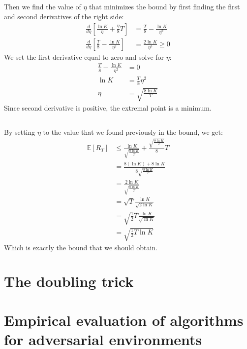 \documentclass[a4paper]{article}
\begin{document}
\subsection{}
\label{subsec:22}
Then we find the value of $\eta$ that minimizes the bound by first finding the
first and second derivatives of the right side:
\begin{align*}
  \frac{d}{d\eta} \left[\frac{\ln{K}}{\eta} + \frac{\eta}{8}T\right]&=
  \frac{T}{8} - \frac{\ln{K}}{\eta^2}\\
  \frac{d}{d\eta} \left[\frac{T}{8} - \frac{\ln{K}}{\eta^2} \right]
  &= \frac{2\ln{K}}{\eta^3} \geq 0 \tag{since $\eta > 0$ and $K>1$}
\end{align*}
We set the first derivative equal to zero and solve for $\eta$:
\begin{align*}
\frac{T}{8} - \frac{\ln{K}}{\eta^2} &= 0\\
\ln{K} &= \frac{T}{8}\eta^2\\
\eta &= \sqrt{\frac{8\ln{K}}{T}}
\end{align*}
Since second derivative is positive, the extremal point is a minimum.
\subsection{}
\label{subsec:23}
By setting $\eta$ to the value that we found previously in the bound, we get:
\begin{align*}
  \mathbb{E}\left[R_{T}\right] &\leq
  \frac{\ln K}{\sqrt{\frac{8\ln{K}}{T}}}+\frac{\sqrt{\frac{8\ln{K}}{T}}}{8} T\\
  &= \frac{8(\ln{K}) + 8\ln{K}} {8\sqrt{\frac{8\ln{K}}{T}}}\\
  &= \frac{2\ln{K}}{\sqrt{\frac{8\ln{K}}{T}}}\\
  &= \sqrt{T} \frac{\ln{K}}{\sqrt{2\ln{K}}}\\
  &= \sqrt{\frac{1}{2}T} \frac{\ln{K}}{\sqrt{\ln{K}}}\\
  &= \sqrt{\frac{1}{2}T \ln{K}}
\end{align*}
Which is exactly the bound that we should obtain.


\section{The doubling trick}
\label{sec:3}

\section{Empirical evaluation of algorithms for adversarial environments}
\label{sec:4}
\end{document}
